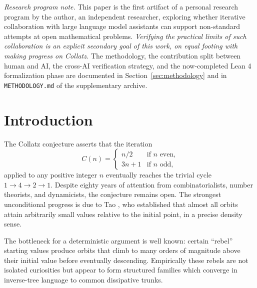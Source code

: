 \documentclass[11pt,a4paper]{article}
\theoremstyle{definition}
\begin{document}
\begin{abstract}
We do not claim a proof of the Collatz conjecture. We claim that the
structural problem at the critical SCC is reduced to two explicit a
priori estimates on finite matrices: the asymptotic boundedness of
the weighted bound under refinement in $T$, and the closure of the
empirical signature support under refinement in $j$. The same
distributional-to-pointwise barrier identified in \cite{chang2026}
manifests itself here in finite-matrix form
(Section~\ref{sec:reduction}). We document supporting numerical
evidence over a five-decade range of parameters, expose the open
estimates as conjectures, and provide all computational scripts and
the Lean 4 formalization as supplementary material.
\end{abstract}

\noindent\textit{Research program note.} This paper is the first
artifact of a personal research program by the author, an independent
researcher, exploring whether iterative collaboration with large
language model assistants can support non-standard attempts at open
mathematical problems. \emph{Verifying the practical limits of such
collaboration is an explicit secondary goal of this work, on equal
footing with making progress on Collatz.} The methodology, the
contribution split between human and AI, the cross-AI verification
strategy, and the now-completed Lean 4 formalization phase are
documented in Section~\ref{sec:methodology} and in
\texttt{METHODOLOGY.md} of the supplementary archive.
\medskip

\tableofcontents

\section{Introduction}
\label{sec:intro}

The Collatz conjecture asserts that the iteration
\[
C(n) =
\begin{cases}
n/2 & \text{if } n \text{ even,} \\
3n+1 & \text{if } n \text{ odd,}
\end{cases}
\]
applied to any positive integer $n$ eventually reaches the trivial
cycle $1 \to 4 \to 2 \to 1$. Despite eighty years of attention from
combinatorialists, number theorists, and dynamicists, the conjecture
remains open. The strongest unconditional progress is due to Tao
\cite{tao2019}, who established that almost all orbits attain
arbitrarily small values relative to the initial point, in a precise
density sense.

The bottleneck for a deterministic argument is well known: certain
``rebel'' starting values produce orbits that climb to many orders
of magnitude above their initial value before eventually descending.
Empirically these rebels are not isolated curiosities but appear to
form structured families which converge in inverse-tree language to
common dissipative trunks.
\end{document}
